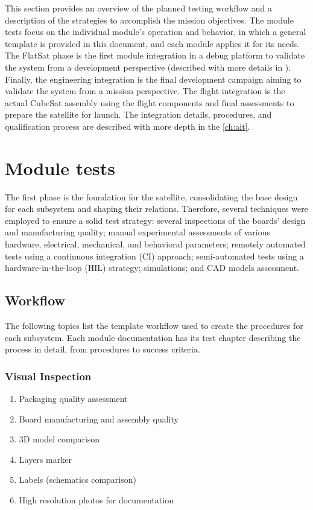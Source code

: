 This section provides an overview of the planned testing workflow and a description of the strategies to accomplish the mission objectives. The module tests focus on the individual module's operation and behavior, in which a general template is provided in this document, and each module applies it for its needs. The FlatSat phase is the first module integration in a debug platform to validate the system from a development perspective (described with more details in \cite{flatsat}). Finally, the engineering integration is the final development campaign aiming to validate the system from a mission perspective. The flight integration is the actual CubeSat assembly using the flight components and final assessments to prepare the satellite for launch. The integration details, procedures, and qualification process are described with more depth in the \autoref{ch:ait}. %


\section{Module tests}

The first phase is the foundation for the satellite, consolidating the base design for each subsystem and shaping their relations. Therefore, several techniques were employed to ensure a solid test strategy: several inspections of the boards' design and manufacturing quality; manual experimental assessments of various hardware, electrical, mechanical, and behavioral parameters; remotely automated tests using a continuous integration (CI) approach; semi-automated tests using a hardware-in-the-loop (HIL) strategy; simulations; and CAD models assessment.

\subsection{Workflow}

The following topics list the template workflow used to create the procedures for each subsystem. Each module documentation has its test chapter describing the process in detail, from procedures to success criteria.

\subsubsection{Visual Inspection} 
\begin{enumerate} \setlength\itemsep{-0.3em}
    \item Packaging quality assessment
    \item Board manufacturing and assembly quality
    \item 3D model comparison
    \item Layers marker
    \item Labels (schematics comparison) 
    \item High resolution photos for documentation
\end{enumerate}

